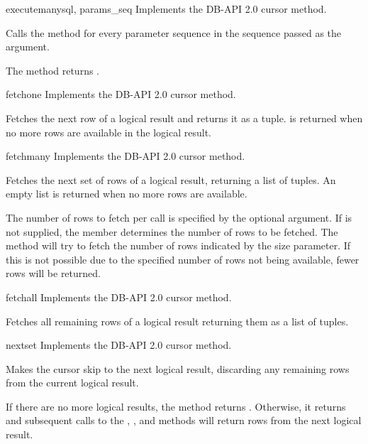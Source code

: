 \begin{methoddesc}[Cursor]{executemany}{sql, params_seq}
Implements the DB-API 2.0 cursor  method.

Calls the  method for every parameter sequence in
the sequence passed as the  argument.

The method returns .
\end{methoddesc}

\begin{methoddesc}[Cursor]{fetchone}{}
Implements the DB-API 2.0 cursor  method.

Fetches the next row of a logical result and returns it as a tuple.
 is returned when no more rows are available in the logical
result.
\end{methoddesc}

\begin{methoddesc}[Cursor]{fetchmany}{}
Implements the DB-API 2.0 cursor  method.

Fetches the next set of rows of a logical result, returning a list of
tuples. An empty list is returned when no more rows are available.

The number of rows to fetch per call is specified by the optional
 argument.  If  is not supplied, the
 member determines the number of rows to be
fetched.  The method will try to fetch the number of rows indicated by
the size parameter.  If this is not possible due to the specified
number of rows not being available, fewer rows will be returned.
\end{methoddesc}

\begin{methoddesc}[Cursor]{fetchall}{}
Implements the DB-API 2.0 cursor  method.

Fetches all remaining rows of a logical result returning them as a
list of tuples.
\end{methoddesc}

\begin{methoddesc}[Cursor]{nextset}{}
Implements the DB-API 2.0 cursor  method.

Makes the cursor skip to the next logical result, discarding any
remaining rows from the current logical result.

If there are no more logical results, the method returns .
Otherwise, it returns  and subsequent calls to the
, , and 
methods will return rows from the next logical result.
\end{methoddesc}

